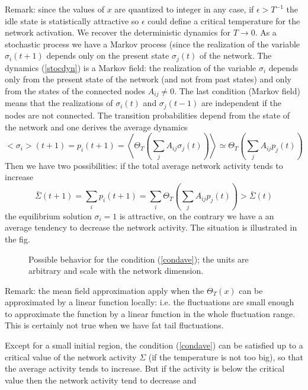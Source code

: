 Remark: since the values of $x$ are
quantized to integer in any case, if $\epsilon>T^{-1}$ the idle state is statistically attractive so $\epsilon$ could define a critical temperature
for the network activation. We recover the deterministic dynamics for $T\to 0$. As a stochastic process we have a Markov process (since
the realization of the variable $\sigma_i(t+1)$ depends only on the present state $\sigma_j(t)$ of the network. The dynamics (\ref{stocdyn})
is a Markov field: the realization of the variable $\sigma_i$ depends only from the present state of the network (and not from past states) and
only from the states of the connected nodes $A_{ij}\ne 0$. The last condition (Markov field) means that the realizations of $\sigma_i(t)$
and $\sigma_j(t-1)$ are independent if the nodes are not connected. The transition probabilities depend from the state of the network
and one derives the average dynamics
\begin{equation}
<\sigma_i>(t+1)=p_i(t+1)=\left \langle \Theta_T\left (\sum_j A_{ij}\sigma_j(t)\right ) \right \rangle\simeq
 \Theta_T\left (\sum_j A_{ij}p_j(t)\right ) 
\label{avestoc}
\end{equation}
Then we have two possibilities: if the total average network activity tends to increase
\begin{equation}
\bar \Sigma(t+1)=\sum_i p_i(t+1) =\sum_i  \Theta_T\left (\sum_j A_{ij}p_j(t)\right ) > \bar \Sigma(t)
\label{condave}
\end{equation}
the equilibrium solution $\sigma_i=1$ is attractive, on the contrary we have a an average tendency to decrease the network activity. 
The situation is illustrated in the fig. \label{fig:crit}
\begin{figure}[h]
\label{fig:crit} 
\caption{Possible behavior for the condition (\ref{condave}); the units are arbitrary and scale with the network dimension.}
\end{figure}
Remark: the mean field approximation apply when the $\Theta_T(x)$ can be approximated by a linear function locally: i.e. the fluctuations are small
enough to approximate the function by a linear function in the whole fluctuation range. This is certainly not true when we have fat tail fluctuations.
\par\noindent
Except for a small initial region, the condition (\ref{condave}) can be satisfied up to a critical value of the network activity $\Sigma$ (if the temperature
is not too big), so that the average activity tends to increase. But if the activity is below the critical value then the network activity tend to decrease and
